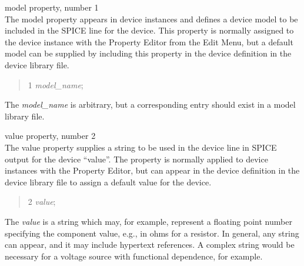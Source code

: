 \begin{description}
\item{\et model} property, number 1\\
The {\et model} property appears in device instances and defines a
device model to be included in the SPICE line for the device.  This
property is normally assigned to the device instance with the {\cb
Property Editor} from the {\cb Edit Menu}, but a default model can be
supplied by including this property in the device definition in the
device library file.
\begin{quote} 1 {\it model\_name\/};
\end{quote}
The {\it model\_name\/} is arbitrary, but a corresponding entry should
exist in a model library file.

\item{\et value} property, number 2\\
The {\et value} property supplies a string to be used in the device
line in SPICE output for the device ``value''.  The property is
normally applied to device instances with the {\cb Property Editor},
but can appear in the device definition in the device library file to
assign a default value for the device.
\begin{quote} 2 {\it value\/};
\end{quote}
The {\it value\/} is a string which may, for example, represent a
floating point number specifying the component value, e.g., in ohms
for a resistor.  In general, any string can appear, and it may include
hypertext references.  A complex string would be necessary for a
voltage source with functional dependence, for example.


\end{description}

